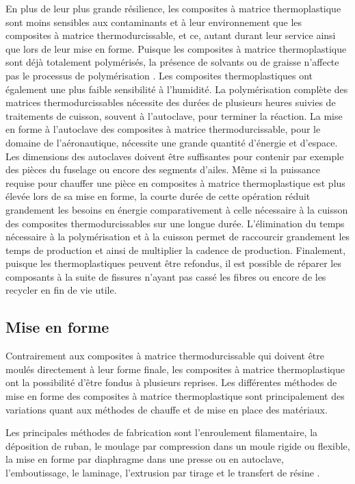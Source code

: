 En plus de leur plus grande résilience, les composites à matrice thermoplastique sont moins sensibles aux contaminants et à leur environnement que les composites à matrice thermodurcissable, et ce, autant durant leur service ainsi que lors de leur mise en forme. 
Puisque les composites à matrice thermoplastique sont déjà totalement polymérisés, la présence de solvants ou de graisse n'affecte pas le processus de polymérisation \cite{cogswell1992}. 
Les composites thermoplastiques ont également une plus faible sensibilité à l'humidité.  
La polymérisation complète des matrices thermodurcissables nécessite des durées de plusieurs heures suivies de traitements de cuisson, souvent à l'autoclave, pour terminer la réaction. 
La mise en forme à l'autoclave des composites à matrice thermodurcissable, pour le domaine de l'aéronautique, nécessite une grande quantité d'énergie et d'espace. 
Les dimensions des autoclaves doivent être suffisantes pour contenir par exemple des pièces du fuselage ou encore des segments d'ailes. 
Même si la puissance requise pour chauffer une pièce en composites à matrice thermoplastique est plus élevée lors de sa mise en forme, la courte durée de cette opération réduit grandement les besoins en énergie comparativement à celle nécessaire à la cuisson des composites thermodurcissables sur une longue durée. 
L'élimination du temps nécessaire à la polymérisation et à la cuisson permet de raccourcir grandement les temps de production et ainsi de multiplier la cadence de production. 
Finalement, puisque les thermoplastiques peuvent être refondus, il est possible de réparer les composants à la suite de fissures n'ayant pas cassé les fibres ou encore de les recycler en fin de vie utile. 

\subsection{Mise en forme}

Contrairement aux composites à matrice thermodurcissable qui doivent être moulés directement à leur forme finale, les composites à matrice thermoplastique ont la possibilité d'être fondus à plusieurs reprises. 
Les différentes méthodes de mise en forme des composites à matrice thermoplastique sont principalement des variations quant aux méthodes de chauffe et de mise en place des matériaux. 

Les principales méthodes de fabrication sont l'enroulement filamentaire, la déposition de ruban, le moulage par compression dans un moule rigide ou flexible, la mise en forme par diaphragme dans une presse ou en autoclave, l'emboutissage, le laminage, l'extrusion par tirage et le transfert de résine \cite{asmhandbook21, campbell2003}.  

